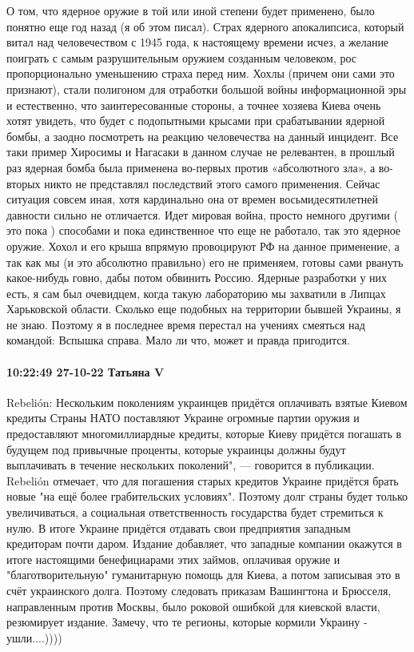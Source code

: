 О том, что ядерное оружие в той или иной степени будет применено, было понятно еще год назад (я об этом писал). Страх ядерного апокалипсиса, который витал над человечеством с 1945 года, к настоящему времени исчез, а желание поиграть с самым разрушительным оружием созданным человеком, рос пропорционально уменьшению страха перед ним.
Хохлы (причем они сами это признают), стали полигоном для отработки большой войны информационной эры и естественно, что заинтересованные стороны, а точнее хозяева Киева очень хотят увидеть, что будет с подопытными крысами при срабатывании ядерной бомбы, а заодно посмотреть на реакцию человечества на данный инцидент.
Все таки пример Хиросимы и Нагасаки в данном случае не релевантен, в прошлый раз ядерная бомба была применена во-первых против «абсолютного зла», а во-вторых никто не представлял последствий этого самого применения. Сейчас ситуация совсем иная, хотя кардинально она от времен восьмидесятилетней давности сильно не отличается.
Идет мировая война, просто немного другими ( это пока ) способами и пока единственное что еще не работало, так это ядерное оружие. Хохол и его крыша впрямую провоцируют РФ на данное применение, а так как мы (и это абсолютно правильно) его не применяем, готовы сами рвануть какое-нибудь говно, дабы потом обвинить Россию.
Ядерные разработки у них есть, я сам был очевидцем, когда такую лабораторию мы захватили в Липцах Харьковской области. Сколько еще подобных на территории бывшей Украины, я не знаю. Поэтому я в последнее время перестал на учениях смеяться над командой: Вспышка справа. Мало ли что, может и правда пригодится.

\paragraph{10:22:49 27-10-22 Татьяна V}

Rebelión: Нескольким поколениям украинцев придётся оплачивать взятые Киевом кредиты
Страны НАТО поставляют Украине огромные партии оружия и предоставляют многомиллиардные кредиты, которые Киеву придётся погашать в будущем под привычные проценты, которые украинцы должны будут выплачивать в течение нескольких поколений", — говорится в публикации.
Rebelión отмечает, что для погашения старых кредитов Украине придётся брать новые "на ещё более грабительских условиях". Поэтому долг страны будет только увеличиваться, а социальная ответственность государства будет стремиться к нулю. В итоге Украине придётся отдавать свои предприятия западным кредиторам почти даром.
Издание добавляет, что западные компании окажутся в итоге настоящими бенефициарами этих займов, оплачивая оружие и "благотворительную" гуманитарную помощь для Киева, а потом записывая это в счёт украинского долга. Поэтому следовать приказам Вашингтона и Брюсселя, направленным против Москвы, было роковой ошибкой для киевской власти, резюмирует издание.
Замечу, что те регионы, которые кормили Украину - ушли....))))

